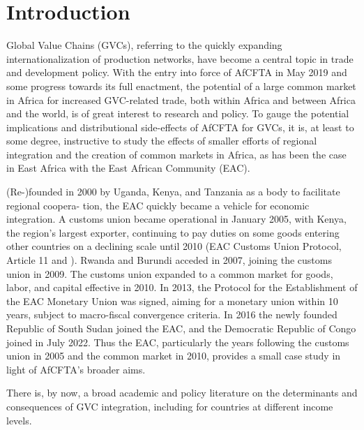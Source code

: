 \documentclass[a4paper]{article}
\begin{document}


\section{Introduction}

Global Value Chains (GVCs), referring to the quickly expanding internationalization of production networks, have become a central topic in trade and development policy. With the entry into force of AfCFTA in May 2019 and some progress towards its full enactment, the potential of a large common market in Africa for increased GVC-related trade, both within Africa and between Africa and the world, is of great interest to research and policy. To gauge the potential implications and distributional side-effects of AfCFTA for GVCs, it is, at least to some degree, instructive to study the effects of smaller efforts of regional integration and the creation of common markets in Africa, as has been the case in East Africa with the East African Community (EAC). \newline 

(Re-)founded in 2000 by Uganda, Kenya, and Tanzania as a body to facilitate regional coopera-
tion, the EAC quickly became a vehicle for economic integration. A customs union became operational in January 2005, with Kenya, the region's largest exporter, continuing to pay duties on some goods entering other countries on a declining scale until 2010 (EAC Customs Union Protocol, Article 11 and \citet{aloo2017free}). Rwanda and Burundi acceded in 2007, joining the customs union in 2009. The customs union expanded to a common market for goods, labor, and capital effective in 2010. In 2013, the Protocol for the Establishment of the EAC Monetary Union was signed, aiming for a monetary union within 10 years, subject to macro-fiscal convergence criteria. In 2016 the newly founded Republic of South Sudan joined the EAC, and the Democratic Republic of Congo joined in July 2022. Thus the EAC, particularly the years following the customs union in 2005 and the common market in 2010, provides a small case study in light of AfCFTA's broader aims. \newline 

There is, by now, a broad academic and policy literature on the determinants and consequences of GVC integration, including for countries at different income levels. \newline
\end{document}
